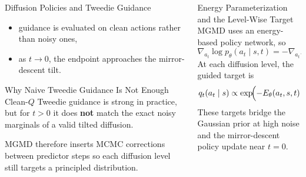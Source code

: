 \documentclass[final,hyperref={pdfpagelabels=false}]{beamer}
\newlength{\colwidth}
\begin{document}
\begin{frame}[t]
\begin{columns}[t]
\begin{column}{\colwidth}
\begin{block}{\Large Diffusion Policies and Tweedie Guidance}
\vspace{0.3em}
\begin{itemize}
  \item guidance is evaluated on clean actions rather than noisy ones,
  \item as $t\to 0$, the endpoint approaches the mirror-descent tilt.
\end{itemize}
\end{block}

\vspace{0.8cm}

\begin{block}{\Large Why Naive Tweedie Guidance Is Not Enough}
\small
Clean-$Q$ Tweedie guidance is strong in practice, but for $t>0$ it does \textbf{not} match the exact noisy marginals of a valid tilted diffusion.

\vspace{0.3em}
MGMD therefore inserts MCMC corrections between predictor steps so each diffusion level still targets a principled distribution.

\vspace{0.5em}
\begin{center}
\end{center}
\end{block}
\end{column}

\begin{column}{\colwidth}
\begin{block}{\Large Energy Parameterization and the Level-Wise Target}
\small
MGMD uses an energy-based policy network, so
\[
\nabla_{a_t}\log p_\theta(a_t\mid s,t)=-\nabla_{a_t}E_\theta(a_t,s,t).
\]
At each diffusion level, the guided target is
\[
q_t(a_t\mid s)\propto \exp\!\Bigl(-E_\theta(a_t,s,t)+\eta\,\bar Q\bigl(s,\hat a_0(a_t)\bigr)\Bigr).
\]
These targets bridge the Gaussian prior at high noise and the mirror-descent policy update near $t=0$.


\end{block}
\end{column}
\end{columns}
\end{frame}
\end{document}
